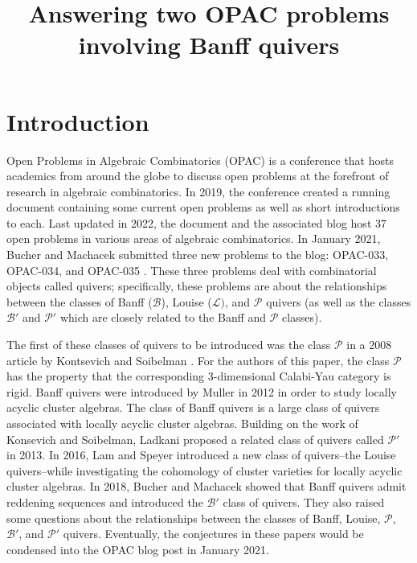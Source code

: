 \documentclass[ALCO,Unicode]{cedram}
\title[Answering two OPAC problems involving Banff quivers]{Answering two OPAC problems involving Banff quivers}
\author[\initial{T.} \middlename{J.} Ervin]{\firstname{Tucker} \middlename{J.} \lastname{Ervin}}
\author[\initial{B.} Jackson]{\firstname{Blake} \lastname{Jackson}}
\newcommand{\BB}{\mathcal{B}}
\newcommand{\PP}{\mathcal{P}}
\newcommand{\LL}{\mathcal{L}}
\begin{document}
\maketitle

\section{Introduction} \label{sec-introduction}
Open Problems in Algebraic Combinatorics (OPAC) is a conference that hosts academics from around the globe to discuss open problems at the forefront of research in algebraic combinatorics.
In 2019, the conference created a running document containing some current open problems as well as short introductions to each. 
Last updated in 2022, the document and the associated blog host 37 open problems in various areas of algebraic combinatorics. 
In January 2021, Bucher and Machacek submitted three new problems to the blog: OPAC-033, OPAC-034, and OPAC-035 \cite{bucher_banff_2021}. 
These three problems deal with combinatorial objects called quivers; specifically, these problems are about the relationships between the classes of Banff ($\BB$), Louise ($\LL)$, and $\PP$ quivers (as well as the classes $\BB'$ and $\PP'$ which are closely related to the Banff and $\PP$ classes).

The first of these classes of quivers to be introduced was the class $\mathcal{P}$ in a 2008 article by Kontsevich and Soibelman \cite{kontsevich_stability_2008}. For the authors of this paper, the class $\PP$ has the property that the corresponding 3-dimensional Calabi-Yau category is rigid. 
Banff quivers were introduced by Muller \cite{MR2995670} in 2012 in order to study locally acyclic cluster algebras. 
The class of Banff quivers is a large class of quivers associated with locally acyclic cluster algebras.
Building on the work of Konsevich and Soibelman, Ladkani \cite{ladkani_cluster_2013} proposed a related class of quivers called $\PP'$ in 2013.
In 2016, Lam and Speyer \cite{MR4384567} introduced a new class of quivers--the Louise quivers--while investigating the cohomology of cluster varieties for locally acyclic cluster algebras.
In 2018, Bucher and Machacek \cite{MR4108215} showed that Banff quivers admit reddening sequences and introduced the $\BB'$ class of quivers.
They also raised some questions about the relationships between the classes of Banff, Louise, $\PP$, $\BB'$, and $\PP'$ quivers.
Eventually, the conjectures in these papers would be condensed into the OPAC blog post in January 2021. 
\end{document}
